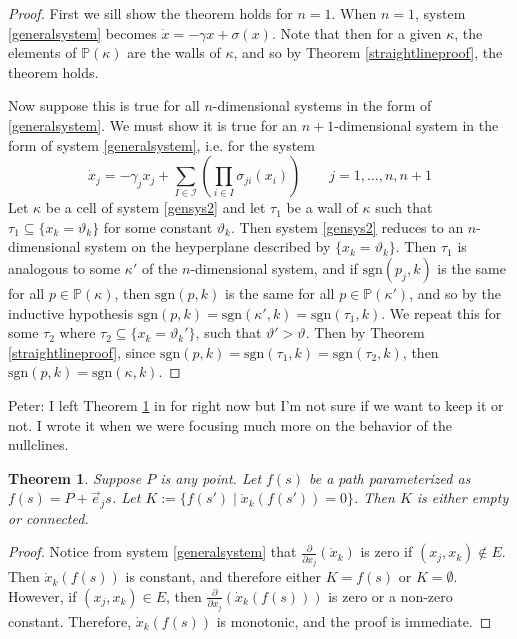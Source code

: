 \documentclass[12pt]{article}
\newtheorem{theorem}{Theorem}[section]
\theoremstyle{definition}
\theoremstyle{remark}
\newcommand\sgn{\text{sgn}}
\newcommand{\bbP}{\mathbb{P}}
\begin{document}
\begin{proof}
First we sill show the theorem holds for $n=1$. When $n=1$, system \eqref{generalsystem} becomes $\dot{x}=-\gamma x + \sigma(x)$. Note that then for a given $\kappa$, the elements of $\bbP(\kappa)$ are the walls of $\kappa$, and so by Theorem \ref{straightlineproof}, the theorem holds.

Now suppose this is true for all $n$-dimensional systems in the form of \eqref{generalsystem}. We must show it is true for an $n+1$-dimensional system in the form of system \eqref{generalsystem}, i.e. for the system
\begin{equation} \label{gensys2}
\dot{x}_j=-\gamma_j x_j + \sum_{I\in \mathcal{I}}\left(\prod_{i\in I}\sigma_{ji}(x_i)\right)	\qquad	j=1,\dots,n,n+1
\end{equation}
Let $\kappa$ be a cell of system \eqref{gensys2} and let $\tau_1$ be a wall of $\kappa$ such that $\tau_1 \subseteq \{x_k=\vartheta_k\}$ for some constant $\vartheta_k$. Then system \eqref{gensys2} reduces to an $n$-dimensional system on the heyperplane described by $\{x_k=\vartheta_k\}$. Then $\tau_1$ is analogous to some $\kappa'$ of the $n$-dimensional system, and if $\sgn(p_j,k)$ is the same for all $p\in \bbP (\kappa)$, then $\sgn(p,k)$ is the same for all $p\in \bbP (\kappa')$, and so by the inductive hypothesis $\sgn(p,k)=\sgn(\kappa',k)=\sgn(\tau_1,k)$. We repeat this for some $\tau_2$ where $\tau_2 \subseteq \{x_k=\vartheta_k'\}$, such that $\vartheta' > \vartheta$. Then by Theorem \ref{straightlineproof}, since $\sgn(p,k)=\sgn(\tau_1,k)=\sgn(\tau_2,k)$, then $\sgn(p,k)=\sgn(\kappa,k)$.
\end{proof}

{\color{cyan} Peter: I left Theorem \ref{infiniteline} in for right now but I'm not sure if we want to keep it or not. I wrote it when we were focusing much more on the behavior of the nullclines.}

\begin{theorem}	\label{infiniteline}
Suppose $P$ is any point. Let $f(s)$ be a path parameterized as $f(s)=P+\vec{e}_j s$. Let $K:=\{f(s') \mid \dot{x}_k(f(s')) =0 \}$. Then $K$ is either empty or connected.
\end{theorem}

\begin{proof}
Notice from system \eqref{generalsystem} that $\frac{\partial}{\partial x_j}(\dot{x}_k)$ is zero if $(x_j,x_k) \notin E$. Then $\dot{x}_k(f(s))$ is constant, and therefore either $K=f(s)$ or $K=\emptyset$. However, if $(x_j,x_k) \in E$, then $\frac{\partial}{\partial x_j}(\dot{x}_k(f(s)))$ is zero or a non-zero constant. Therefore, $\dot{x}_k(f(s))$ is monotonic, and the proof is immediate.
\end{proof}
\end{document}
